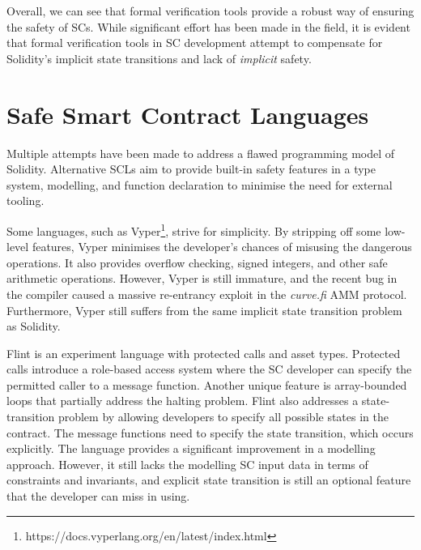 \documentclass[oneside]{ecsproject}     %
\begin{document}
Overall, we can see that formal verification tools provide a robust way of ensuring the safety of SCs. 
While significant effort has been made in the field, it is evident that formal verification tools in SC development
attempt to compensate for Solidity's implicit state transitions and lack of \textit{implicit} safety.

\section{Safe Smart Contract Languages} \label{Chapter:SCL}

Multiple attempts have been made to address a flawed programming model of Solidity\cite{sc_survey}. Alternative SCLs aim to provide
built-in safety features in a type system, modelling, and function declaration to minimise the need for
external tooling. 

Some languages, such as Vyper\footnote{https://docs.vyperlang.org/en/latest/index.html}, strive for simplicity.
By stripping off some low-level features, Vyper minimises the developer's chances of misusing the dangerous operations.
It also provides overflow checking, signed integers, and other safe arithmetic operations. However, Vyper is still immature, 
and the recent bug in the compiler caused a massive re-entrancy exploit in the \textit{curve.fi} AMM protocol\cite{curve}.
Furthermore, Vyper still suffers from the same implicit state transition problem as Solidity.


Flint is an experiment language with protected calls and asset types\cite{flint}. Protected calls introduce a role-based access system
where the SC developer can specify the permitted caller to a message function. Another unique feature is array-bounded loops
that partially address the halting problem. Flint also addresses a state-transition problem by allowing developers to specify
all possible states in the contract. The message functions need to specify the state transition, which occurs explicitly.
The language provides a significant improvement in a modelling approach. However, it still lacks the modelling SC input data in terms
of constraints and invariants, and explicit state transition is still an optional feature that the developer can miss in using.
\end{document}

